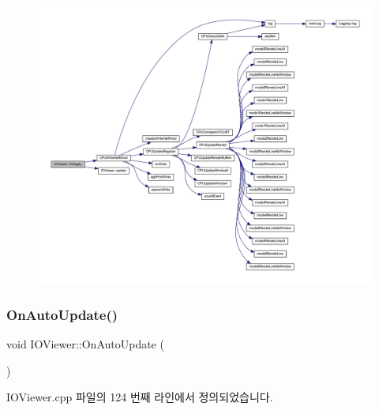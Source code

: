 \begin{figure}[H]
\begin{center}
\leavevmode
\includegraphics[width=350pt]{class_i_o_viewer_ab90a9bf33360f3410ea2d1341b61e6d9_cgraph}
\end{center}
\end{figure}
\mbox{\label{class_i_o_viewer_a8e9ae4ebf837dff76500534337c0d609}} 
\subsubsection{\texorpdfstring{On\+Auto\+Update()}{OnAutoUpdate()}}
{\footnotesize\ttfamily void I\+O\+Viewer\+::\+On\+Auto\+Update (\begin{DoxyParamCaption}{ }\end{DoxyParamCaption})\hspace{0.3cm}{\ttfamily [protected]}}



I\+O\+Viewer.\+cpp 파일의 124 번째 라인에서 정의되었습니다.


